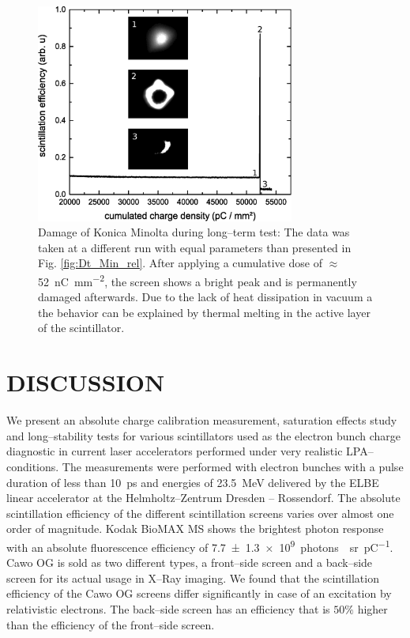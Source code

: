 \documentclass[%
preprint,
amsmath,
amssymb,
aip,
rsi, 
numerical,
floatfix,
]{revtex4-1}
\begin{document}
\begin{figure}
\includegraphics[width=8.5cm]{./Figures/Damage}%
\caption{\label{fig:Damage} Damage of Konica Minolta during long--term test: 
The data was taken at a different run with equal parameters than presented in Fig. \ref{fig:Dt_Min_rel}. 
After applying a cumulative dose of $\approx$ \SI[per-mode=symbol]{52}{\nano \coulomb \per \square \milli \meter}, the screen shows a bright peak and is permanently damaged afterwards. 
Due to the lack of heat dissipation in vacuum a the behavior can be explained by thermal melting in the active layer of the scintillator.}
\end{figure}

\section{\label{Cn} DISCUSSION}
We present an absolute charge calibration measurement, saturation effects study and long--stability tests for various scintillators used as the electron bunch charge diagnostic in current laser accelerators performed under very realistic LPA--conditions.
The measurements were performed with electron bunches with a pulse duration of less than \SI{10}{\pico\second} and energies of \SI{23.5}{\mega\electronvolt} delivered by the ELBE linear accelerator at the Helmholtz--Zentrum Dresden -- Rossendorf.
The absolute scintillation efficiency of the different scintillation screens varies over almost one order of magnitude.
Kodak BioMAX MS shows the brightest photon response with an absolute fluorescence efficiency of \SI[separate-uncertainty = true]{7.7(13)e9}{photons \per \steradian \per \pico \coulomb}.  
Cawo OG is sold as two different types, a front--side screen and a back--side screen for its actual usage in X--Ray imaging. 
We found that the scintillation efficiency of the Cawo OG screens differ significantly in case of an excitation by relativistic electrons.
The back--side screen has an efficiency that is $50\%$ higher than the efficiency of the front--side screen.
 
\end{document}
